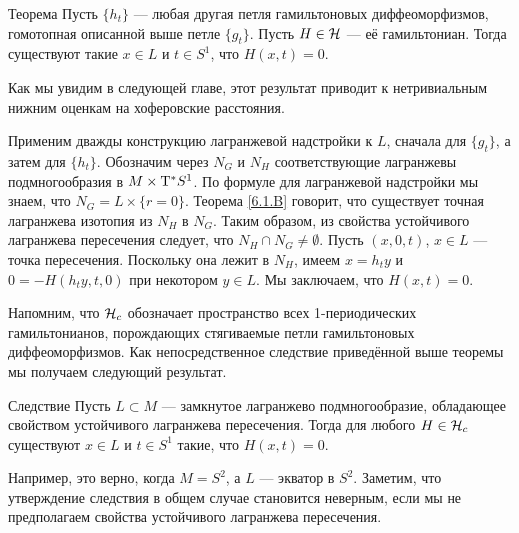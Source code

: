 \begin{thm}{Теорема}\label{6.3.A}
Пусть $\{h_t\}$ — любая другая петля гамильтоновых диффеоморфизмов, гомотопная описанной выше петле $\{g_t\}$.
Пусть $H \in \mathcal{H}$ — её гамильтониан.
Тогда существуют такие $x \in L$ и $t \in S^1$, что $H (x, t) = 0$.
\end{thm}

Как мы увидим в следующей главе, этот результат приводит к нетривиальным нижним оценкам на хоферовские расстояния.

Применим дважды конструкцию лагранжевой надстройки к $L$, сначала для $\{g_t\}$, а затем для $\{h_t\}$.
Обозначим через $N_G$ и $N_H$ соответствующие лагранжевы подмногообразия в $M \times \mathrm{T}^\ast S^1$.
По формуле для лагранжевой надстройки мы знаем, что $N_G = L \times \{r = 0\}$.
Теорема \ref{6.1.B} говорит, что существует точная лагранжева
изотопия из $N_H$ в $N_G$. 
Таким образом, из свойства устойчивого лагранжева пересечения следует,
что $N_H \cap N_G \ne \emptyset$. 
Пусть $(x, 0, t)$, $x \in L$ — точка пересечения.
Поскольку она лежит в $N_H$, имеем $x = h_t y$ и $0 = -H (h_t y, t, 0)$
при некотором $y \in L$. 
Мы заключаем, что $H (x, t) = 0$.
\qeds

Напомним, что $\mathcal{H}_c$ обозначает пространство всех 1-периодических
гамильтонианов, порождающих стягиваемые петли гамильтоновых
диффеоморфизмов. 
Как непосредственное следствие приведённой выше теоремы мы получаем
следующий результат. 

\begin{thm}{Следствие}\label{6.3.B}
Пусть $L \subset M$ — замкнутое лагранжево подмногообразие,
обладающее свойством устойчивого лагранжева пересечения. 
Тогда для любого $H \in \mathcal{H}_c$ существуют $x \in L$ и $t \in S^1$ такие, что $H (x, t) = 0$.
\end{thm}


Например, это верно, когда $M = S^2$, а $L$ — экватор в $S^2$.
Заметим, что утверждение следствия в общем случае становится неверным,
если мы не предполагаем свойства устойчивого лагранжева пересечения.

